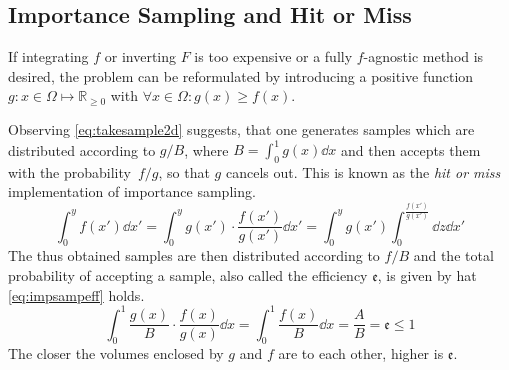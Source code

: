 \subsection{Importance Sampling and Hit or Miss}%
\label{sec:hitmiss}
If integrating \(f\) or inverting \(F\) is too expensive or a fully
\(f\)-agnostic method is desired, the problem can be reformulated by
introducing a positive function
\(g\colon x\in\Omega\mapsto\mathbb{R}_{\geq 0}\) with
\(\forall x\in\Omega\colon g(x)\geq f(x)\).

Observing \cref{eq:takesample2d} suggests, that one generates samples
which are distributed according to \(g/B\), where
\(B=\int_0^1g(x)\dd{x}\) and then accepts them with the
probability~\(f/g\), so that \(g\) cancels out. This is known as the
\emph{hit or miss} implementation of importance sampling.
%
\begin{equation}
  \label{eq:takesample2d}
  \int_{0}^{y}f(x')\dd{x'} =
  \int_{0}^{y}g(x')\cdot\frac{f(x')}{g(x')}\dd{x'}
  = \int_{0}^{y}g(x')\int_{0}^{\frac{f(x')}{g(x')}}\dd{z}\dd{x'}
\end{equation}
%
The thus obtained samples are then distributed according to \(f/B\)
and the total probability of accepting a sample, also called the
efficiency \(\mathfrak{e}\), is given by hat \cref{eq:impsampeff}
holds.
%
\begin{equation}
  \label{eq:impsampeff}
  \int_0^1\frac{g(x)}{B}\cdot\frac{f(x)}{g(x)}\dd{x} = \int_0^1\frac{f(x)}{B}\dd{x} = \frac{A}{B} = \mathfrak{e}\leq 1
\end{equation}
%
The closer the volumes enclosed by \(g\) and \(f\) are to each other,
higher is \(\mathfrak{e}\).

